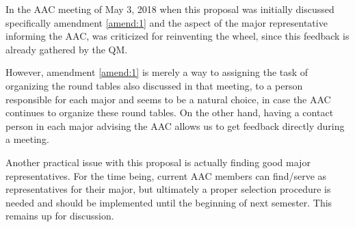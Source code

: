 In the AAC meeting of May 3, 2018 when this proposal was initially discussed specifically amendment \ref{amend:1} and the aspect of the major representative informing the AAC, was criticized for reinventing the wheel, since this feedback is already gathered by the QM. 

However, amendment \ref{amend:1} is merely a way to assigning the task of organizing the round tables also discussed in that meeting, to a person responsible for each major and seems to be a natural choice, in case the AAC continues to organize these round tables. 
On the other hand, having a contact person in each major advising the AAC allows us to get feedback directly during a meeting. 

Another practical issue with this proposal is actually finding good major representatives. For the time being, current AAC members can find/serve as representatives for their major, but ultimately a proper selection procedure is needed and should be implemented until the beginning of next semester. This remains up for discussion.